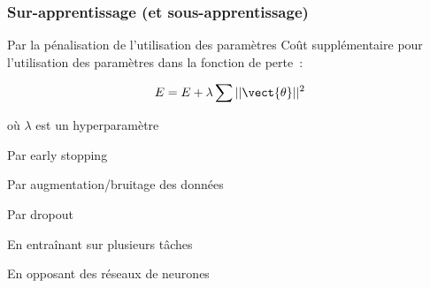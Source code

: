 \begin{frame}
  \frametitle{Sur-apprentissage (et sous-apprentissage)}
\end{frame}

\begin{frame}{Par la pénalisation de l'utilisation des paramètres}
  Coût supplémentaire pour l'utilisation des paramètres dans la fonction de perte~:

  \[
    E = E + \lambda\sum||\vect{\theta}||^2
  \]

  où $\lambda$ est un hyperparamètre
\end{frame}

\begin{frame}{Par early stopping}
\end{frame}

\begin{frame}{Par augmentation/bruitage des données}
\end{frame}

\begin{frame}{Par dropout}
\end{frame}

\begin{frame}{En entraînant sur plusieurs tâches}
\end{frame}

\begin{frame}{En opposant des réseaux de neurones}
\end{frame}
